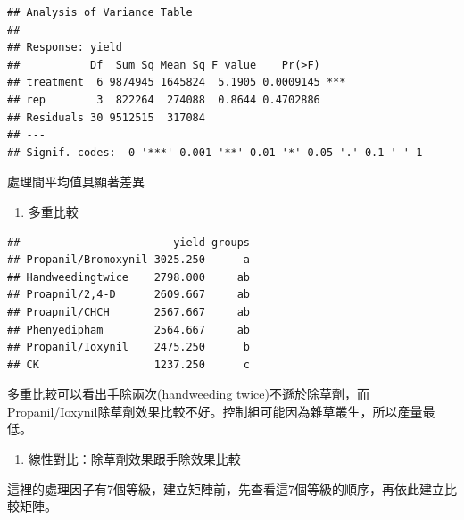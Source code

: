\documentclass[
]{book}
\newenvironment{Shaded}{\begin{snugshade}}{\end{snugshade}}
\newcommand{\AttributeTok}[1]{\textcolor[rgb]{0.77,0.63,0.00}{#1}}
\newcommand{\CommentTok}[1]{\textcolor[rgb]{0.56,0.35,0.01}{\textit{#1}}}
\newcommand{\FunctionTok}[1]{\textcolor[rgb]{0.00,0.00,0.00}{#1}}
\newcommand{\NormalTok}[1]{#1}
\newcommand{\OtherTok}[1]{\textcolor[rgb]{0.56,0.35,0.01}{#1}}
\newcommand{\SpecialCharTok}[1]{\textcolor[rgb]{0.00,0.00,0.00}{#1}}
\newcommand{\StringTok}[1]{\textcolor[rgb]{0.31,0.60,0.02}{#1}}
\providecommand{\tightlist}{%
  \setlength{\itemsep}{0pt}\setlength{\parskip}{0pt}}
\begin{document}
\begin{verbatim}
## Analysis of Variance Table
## 
## Response: yield
##           Df  Sum Sq Mean Sq F value    Pr(>F)    
## treatment  6 9874945 1645824  5.1905 0.0009145 ***
## rep        3  822264  274088  0.8644 0.4702886    
## Residuals 30 9512515  317084                      
## ---
## Signif. codes:  0 '***' 0.001 '**' 0.01 '*' 0.05 '.' 0.1 ' ' 1
\end{verbatim}

處理間平均值具顯著差異

\begin{enumerate}
\def\labelenumi{\arabic{enumi}.}
\setcounter{enumi}{2}
\tightlist
\item
  多重比較
\end{enumerate}

\begin{Shaded}
\end{Shaded}

\begin{verbatim}
##                        yield groups
## Propanil/Bromoxynil 3025.250      a
## Handweedingtwice    2798.000     ab
## Proapnil/2,4-D      2609.667     ab
## Proapnil/CHCH       2567.667     ab
## Phenyedipham        2564.667     ab
## Propanil/Ioxynil    2475.250      b
## CK                  1237.250      c
\end{verbatim}

多重比較可以看出手除兩次(handweeding twice)不遜於除草劑，而Propanil/Ioxynil除草劑效果比較不好。控制組可能因為雜草叢生，所以產量最低。

\begin{enumerate}
\def\labelenumi{\arabic{enumi}.}
\setcounter{enumi}{3}
\tightlist
\item
  線性對比：除草劑效果跟手除效果比較
\end{enumerate}

這裡的處理因子有7個等級，建立矩陣前，先查看這7個等級的順序，再依此建立比較矩陣。

\begin{Shaded}
\end{Shaded}
\end{document}
